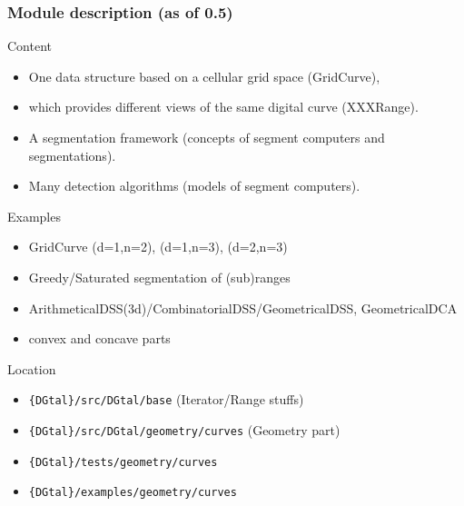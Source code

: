 \begin{frame}[squeeze]
  \frametitle{Module description (as of 0.5)}

  \begin{block}{Content}
    \begin{itemize}
      \small
    \item One data structure based on a cellular grid space (GridCurve),
    \item which provides different views of the same digital curve (XXXRange).
    \item A segmentation framework (concepts of segment computers and segmentations).
    \item Many detection algorithms (models of segment computers).
    \end{itemize}
  \end{block}

  \begin{block}{Examples}
    \begin{itemize}
      \small
    \item GridCurve (d=1,n=2), (d=1,n=3), (d=2,n=3)
    \item Greedy/Saturated segmentation of (sub)ranges
    \item ArithmeticalDSS(3d)/CombinatorialDSS/GeometricalDSS, GeometricalDCA
    \item convex and concave parts
    \end{itemize}
  \end{block}

  \begin{block}{Location}
    \begin{itemize}
    \item \texttt{\{DGtal\}/src/DGtal/base} (Iterator/Range stuffs)
    \item \texttt{\{DGtal\}/src/DGtal/geometry/curves} (Geometry part) 
    \item \texttt{\{DGtal\}/tests/geometry/curves}
    \item \texttt{\{DGtal\}/examples/geometry/curves}
    \end{itemize}
  \end{block}

\end{frame}
